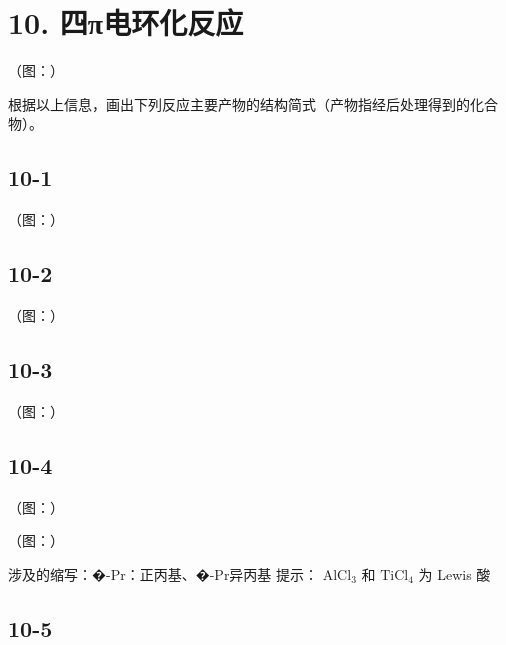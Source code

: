 \section*{10. 四π电环化反应}
（图：）

根据以上信息，画出下列反应主要产物的结构简式（产物指经后处理得到的化合物）。

\subsection*{10-1}
（图：）

\subsection*{10-2}
（图：）

\subsection*{10-3}
（图：）

\subsection*{10-4}
（图：）

（图：）

涉及的缩写：�-Pr：正丙基、�-Pr异丙基 提⽰： $\mathrm { { A l C l } _ { 3 } }$ 和 $\mathrm { T i C l _ { 4 } }$ 为 Lewis 酸

\subsection*{10-5}